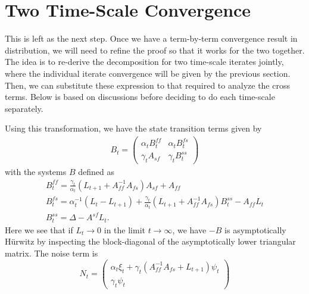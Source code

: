 \section{Two Time-Scale Convergence}
This is left as the next step. 
Once we have a term-by-term convergence result in distribution, we will need to refine the proof so that it works for the two together. 
The idea is to re-derive the decomposition for two time-scale iterates jointly, where the individual iterate convergence will be given by the previous section.
Then, we can substitute these expression to that required to analyze the cross terms.
{\color{red}Below is based on discussions before deciding to do each time-scale separately.}



Using this transformation, we have the state transition terms given by
\begin{align*}
    B_t = \begin{pmatrix}
        \alpha_t B_t^{ff} & \alpha_t B_t^{fs} \\ \gamma_t A_{sf} & \gamma_t B_t^{ss}
    \end{pmatrix}  
\end{align*}
with the systems $B$ defined as
\begin{align*}
    B_t^{ff} = \frac{\gamma_t}{\alpha_t}(L_{t+1} + A_{ff}^{-1} A_{fs}) A_{sf} + A_{ff} \\ 
    B_t^{fs} = \alpha_t^{-1} \left(L_t - L_{t+1}\right) + \frac{\gamma_t}{\alpha_t}\left(L_{t+1} + A_{ff}^{-1} A_{fs}\right) B_t^{ss} - A_{ff} L_t \\ 
    B_t^{ss} = \Delta - A^{sf} L_t .
\end{align*}
Here we see that if $L_t \to 0$ in the limit $t \to \infty$, we have $-B$ is asymptotically H\"{u}rwitz by inspecting the block-diagonal of the asymptotically lower triangular matrix.
The noise term is
\begin{equation}
    N_t = \begin{pmatrix}
        \alpha_t \xi_t + \gamma_t (A_{ff}^{-1} A_{fs} + L_{t+1}) \psi_t \\ \gamma_t \psi_t 
    \end{pmatrix} 
\end{equation}



